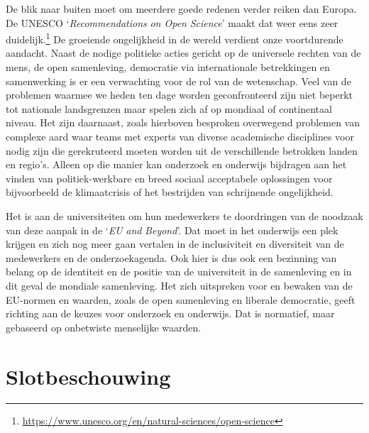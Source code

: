 \documentclass[smallauthor, chapterhaspagenum, nochapterinheader, pagenuminheader,  bigchapnum,medium2, tocpages, garamond, titleinheader]{jote-book}
\begin{document}
	De blik naar buiten moet om meerdere goede redenen verder reiken dan Europa. De UNESCO ‘\emph{Recommendations}\emph{ on Open }\emph{Science}' maakt dat weer eens zeer duidelijk.\footnote{\href{https://www.unesco.org/en/natural-sciences/open-science}{https://www.unesco.org/en/natural-sciences/open-science} } De groeiende ongelijkheid in de wereld verdient onze voortdurende aandacht. Naast de nodige politieke acties gericht op de universele rechten van de mens, de open samenleving, democratie via internationale betrekkingen en samenwerking is er een verwachting voor de rol van de wetenschap. Veel van de problemen waarmee we heden ten dage worden geconfronteerd zijn niet beperkt tot nationale landsgrenzen maar spelen zich af op mondiaal of continentaal niveau. Het zijn daarnaast, zoals hierboven besproken overwegend problemen van complexe aard waar teams met experts van diverse academische disciplines voor nodig zijn die gerekruteerd moeten worden uit de verschillende betrokken landen en regio's. Alleen op die manier kan onderzoek en onderwijs bijdragen aan het vinden van politiek-werkbare en breed sociaal acceptabele oplossingen voor bijvoorbeeld de klimaatcrisis of het bestrijden van schrijnende ongelijkheid.



	Het is aan de universiteiten om hun medewerkers te doordringen van de noodzaak van deze aanpak in de ‘\emph{EU }\emph{and}\emph{ Beyond}'. Dat moet in het onderwijs een plek krijgen en zich nog meer gaan vertalen in de inclusiviteit en diversiteit van de medewerkers en de onderzoekagenda. Ook hier is dus ook een bezinning van belang op de identiteit en de positie van de universiteit in de samenleving en in dit geval de mondiale samenleving. Het zich uitspreken voor en bewaken van de EU-normen en waarden, zoals de open samenleving en liberale democratie, geeft richting aan de keuzes voor onderzoek en onderwijs. Dat is normatief, maar gebaseerd op onbetwiste menselijke waarden.



	\section{Slotbeschouwing}
\end{document}
